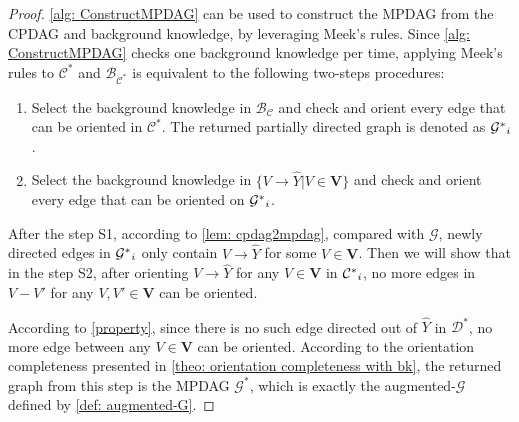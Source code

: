 \documentclass{article} %
\begin{document}
\begin{proof}
    \cref{alg: ConstructMPDAG} can be used to construct the MPDAG from the CPDAG and background knowledge, by leveraging Meek's rules. Since \cref{alg: ConstructMPDAG} checks one background knowledge per time, applying Meek's rules to $\mathcal{C^{*}}$ and $\mathcal{B_{C^*}}$ is equivalent to the following two-steps procedures:
    \begin{enumerate}%
    \itemsep0em
        \item[S1.] Select the background knowledge in $\mathcal{B_C}$ and check and orient every edge that can be oriented in $\mathcal{C^*}$. The returned partially directed graph is denoted as $\mathcal{G^{*}}_{\uppercase\expandafter{\romannumeral1}}$.
        \item[S2.] Select the background knowledge in $\{V \rightarrow \hat{Y}|V \in \mathbf{V}\}$ and check and orient every edge that can be oriented on $\mathcal{G^{*}}_{\uppercase\expandafter{\romannumeral1}}$.
    \end{enumerate}
    After the step S1, according to \cref{lem: cpdag2mpdag}, compared with $\mathcal{G}$, newly directed edges in $\mathcal{G^{*}}_{\uppercase\expandafter{\romannumeral1}}$ only contain $V \rightarrow \hat{Y}$ for some $V \in \mathbf{V}$. Then we will show that in the step S2, after orienting $V \rightarrow \hat{Y}$ for any $V \in \mathbf{V}$ in $\mathcal{C^{*}}_{\uppercase\expandafter{\romannumeral1}}$, no more edges in $V - V'$ for any $V, V' \in \mathbf{V}$ can be oriented.

    According to \ref{property}, since there is no such edge directed out of $\hat{Y}$ in $\mathcal{D^{*}}$, no more edge between any $V \in \mathbf{V}$ can be oriented. According to the orientation completeness presented in \cref{theo: orientation completeness with bk}, the returned graph from this step is the MPDAG $\mathcal{G^{*}}$, which is exactly the augmented-$\mathcal{G}$ defined by \cref{def: augmented-G}.
\end{proof}    
    
\end{document}
